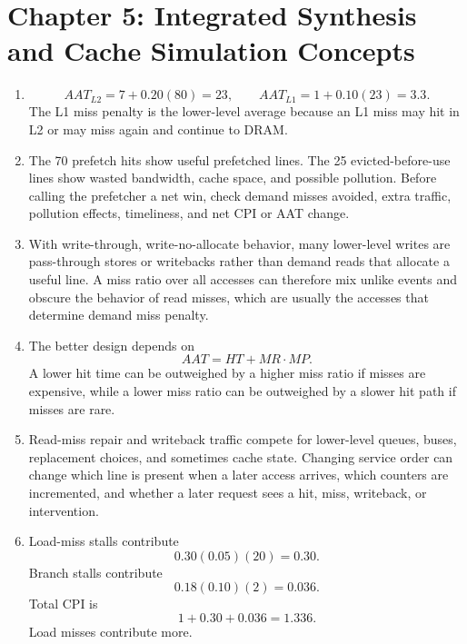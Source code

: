 \documentclass[11pt]{article}
\begin{document}
\section{Chapter 5: Integrated Synthesis and Cache Simulation Concepts}
\begin{enumerate}
    \item
    \[
        AAT_{L2}=7+0.20(80)=23,\qquad
        AAT_{L1}=1+0.10(23)=3.3.
    \]
    The L1 miss penalty is the lower-level average because an L1 miss may hit in L2 or may miss again and continue to DRAM.

    \item The 70 prefetch hits show useful prefetched lines.
    The 25 evicted-before-use lines show wasted bandwidth, cache space, and possible pollution.
    Before calling the prefetcher a net win, check demand misses avoided, extra traffic, pollution effects, timeliness, and net CPI or AAT change.

    \item With write-through, write-no-allocate behavior, many lower-level writes are pass-through stores or writebacks rather than demand reads that allocate a useful line.
    A miss ratio over all accesses can therefore mix unlike events and obscure the behavior of read misses, which are usually the accesses that determine demand miss penalty.

    \item The better design depends on
    \[
        AAT=HT+MR\cdot MP.
    \]
    A lower hit time can be outweighed by a higher miss ratio if misses are expensive, while a lower miss ratio can be outweighed by a slower hit path if misses are rare.

    \item Read-miss repair and writeback traffic compete for lower-level queues, buses, replacement choices, and sometimes cache state.
    Changing service order can change which line is present when a later access arrives, which counters are incremented, and whether a later request sees a hit, miss, writeback, or intervention.

    \item Load-miss stalls contribute
    \[
        0.30(0.05)(20)=0.30.
    \]
    Branch stalls contribute
    \[
        0.18(0.10)(2)=0.036.
    \]
    Total CPI is
    \[
        1+0.30+0.036=1.336.
    \]
    Load misses contribute more.
\end{enumerate}
\end{document}

